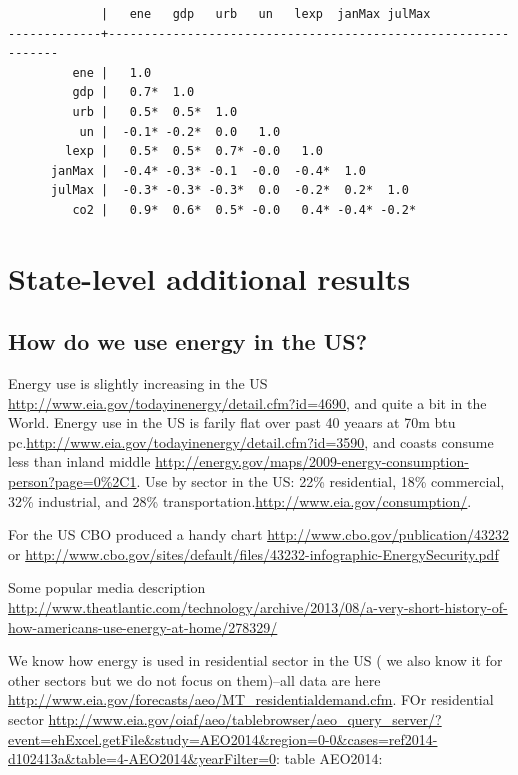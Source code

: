 \documentclass[10pt, letterpaper]{article}
\begin{document}
\begin{spacing}{1.4}
\begin{verbatim}
             |   ene   gdp   urb   un   lexp  janMax julMax
-------------+---------------------------------------------------------------
         ene |   1.0 
         gdp |   0.7*  1.0 
         urb |   0.5*  0.5*  1.0 
          un |  -0.1* -0.2*  0.0   1.0 
        lexp |   0.5*  0.5*  0.7* -0.0   1.0 
      janMax |  -0.4* -0.3* -0.1  -0.0  -0.4*  1.0 
      julMax |  -0.3* -0.3* -0.3*  0.0  -0.2*  0.2*  1.0 
         co2 |   0.9*  0.6*  0.5* -0.0   0.4* -0.4* -0.2*

\end{verbatim}

\section{State-level additional results}
\subsection{How do we use energy in the US?}

Energy use is slightly increasing in the US
\url{http://www.eia.gov/todayinenergy/detail.cfm?id=4690}, and quite a bit in
the World. 
Energy use in the US is farily flat over past 40 yeaars at 70m btu
pc.\url{http://www.eia.gov/todayinenergy/detail.cfm?id=3590}, and coasts consume
less than inland middle
\url{http://energy.gov/maps/2009-energy-consumption-person?page=0%2C1}. 
Use by sector in the US: 22\% residential, 18\% commercial, 32\% industrial, and
28\% transportation.\url{http://www.eia.gov/consumption/}. 


For the US CBO produced a handy chart \url{http://www.cbo.gov/publication/43232} or \url{http://www.cbo.gov/sites/default/files/43232-infographic-EnergySecurity.pdf}

Some popular media description
\url{http://www.theatlantic.com/technology/archive/2013/08/a-very-short-history-of-how-americans-use-energy-at-home/278329/}

We know how energy is used in residential sector in the US ( we also know it for
other sectors but we do not focus on them)--all data are here
\url{http://www.eia.gov/forecasts/aeo/MT_residentialdemand.cfm}. FOr residential
sector
\url{http://www.eia.gov/oiaf/aeo/tablebrowser/aeo_query_server/?event=ehExcel.getFile&study=AEO2014&region=0-0&cases=ref2014-d102413a&table=4-AEO2014&yearFilter=0}:
table AEO2014: 



\end{spacing}
\end{document}
